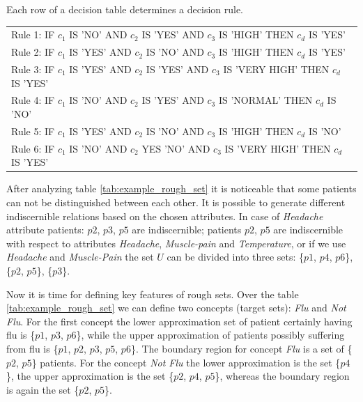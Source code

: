Each row of a decision table determines a decision rule. 

\begin{tabular}[H]{l}
    Rule 1:  IF $c_1$ IS 'NO' AND $c_2$ IS 'YES' AND $c_3$ IS 'HIGH' THEN $c_d$
    IS 'YES' \\
    Rule 2:  IF $c_1$ IS 'YES' AND $c_2$ IS 'NO' AND $c_3$ IS 'HIGH' THEN $c_d$
    IS 'YES' \\
    Rule 3:  IF $c_1$ IS 'YES' AND $c_2$ IS 'YES' AND $c_3$ IS 'VERY HIGH' THEN
    $c_d$ IS 'YES' \\
    Rule 4:  IF $c_1$ IS 'NO' AND $c_2$ IS 'YES' AND $c_3$ IS 'NORMAL' THEN
    $c_d$ IS 'NO' \\
    Rule 5:  IF $c_1$ IS 'YES' AND $c_2$ IS 'NO' AND $c_3$ IS 'HIGH' THEN $c_d$
    IS 'NO' \\
    Rule 6:  IF $c_1$ IS 'NO' AND $c_2$ YES 'NO' AND $c_3$ IS 'VERY HIGH' THEN
    $c_d$ IS 'YES'  
\end{tabular}


After analyzing table \ref{tab:example_rough_set} it is noticeable that some
patients can not be distinguished between each other.
It is possible to generate different indiscernible relations based on 
the chosen attributes. In case of \textit{Headache} attribute patients: $p2$,
$p3$, $p5$ are indiscernible; patients $p2$, $p5$ are
indiscernible with respect to attributes \textit{Headache},
\textit{Muscle-pain} and \textit{Temperature}, or if we use \textit{Headache}
and \textit{Muscle-Pain} the set $U$ can be divided into three sets:
\{$p1$, $p4$, $p6$\}, \{$p2$, $p5$\}, \{$p3$\}.

Now it is time for defining key features of rough sets. Over the table
\ref{tab:example_rough_set} we can define two concepts (target sets):
\textit{Flu} and \textit{Not Flu}. For the first concept the lower approximation
set of patient certainly having flu is \{$p1$, $p3$, $p6$\}, while the upper
approximation of patients possibly suffering from flu is \{$p1$, $p2$, $p3$,
$p5$, $p6$\}. The boundary region for concept \textit{Flu} is a set of \{$p2$, $p5$\} 
patients. For the concept \textit{Not Flu} the lower approximation is the set
\{$p4$\}, the upper approximation is the set \{$p2$, $p4$, $p5$\}, whereas the 
boundary region is again the set \{$p2$, $p5$\}.

